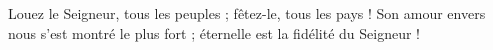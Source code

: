 Louez le Seigneur, tous les peuples ; fêtez-le, tous les pays !
\versseparator
Son amour envers nous s'est montré le plus fort ; éternelle est la fidélité du Seigneur !
